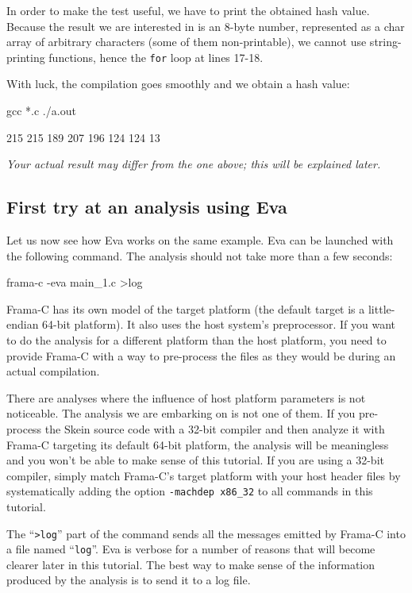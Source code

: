 \documentclass[web]{frama-c-book}
\makeatletter
\newenvironment{important}%
{\hspace{5pt plus \linewidth minus \marginparsep}%
 \begin{lrbox}{\@tempboxa}%
   \begin{minipage}{\linewidth - 2\fboxsep}\itshape}
{\end{minipage}\end{lrbox}\colorbox{gris}{\usebox{\@tempboxa}}}
\newcommand{\Eva}{\textsf{Eva}}
\makeatother
\begin{document}
In order to make the test useful, we have to print
the obtained hash value. Because the result we are interested in is
an 8-byte number, represented as a char array of 
arbitrary characters (some of them non-printable), we cannot
use string-printing functions, hence the \lstinline|for| loop at lines 17-18.
\goodbreak

With luck, the compilation goes smoothly and we obtain
a hash value:
\begin{shell}
gcc *.c
./a.out
\end{shell}

\begin{logs}
215
215
189
207
196
124
124
13
\end{logs}

\begin{important}
  Your actual result may differ from the one above;
  this will be explained later.
\end{important}

\subsection{First try at an analysis using \Eva{}}

Let us now see how \Eva{} works on the same example.
\Eva{} can be launched with the following command. 
The analysis should not take more than a few seconds:
\begin{listing-nonumber}
frama-c -eva main_1.c >log
\end{listing-nonumber}

Frama-C has its own model of the target platform (the default target is
a little-endian 64-bit platform). It also uses the host system's preprocessor.
If you want to do the analysis for a different platform than the host platform,
you need to provide Frama-C with a way to pre-process the files as they
would be during an actual compilation. 

There are analyses where the influence of host platform parameters
is not noticeable. The analysis we are embarking on is not one of them.
If you pre-process the Skein source code with a 32-bit compiler and
then analyze it with Frama-C targeting its default 64-bit platform,
the analysis will be meaningless and you won't be able to make sense of
this tutorial.
If you are using a 32-bit compiler, simply match
Frama-C's target platform with your host header files by systematically adding 
the option \verb|-machdep x86_32| to all commands in
this tutorial.

The ``\lstinline|>log|'' part of the command sends all
the messages emitted by Frama-C into a file named
``\lstinline|log|''. \Eva{} is verbose for a number of reasons that
will become clearer later in this tutorial.
The best way to make sense of the information 
produced by the analysis is
to send it to a log file.
\end{document}
